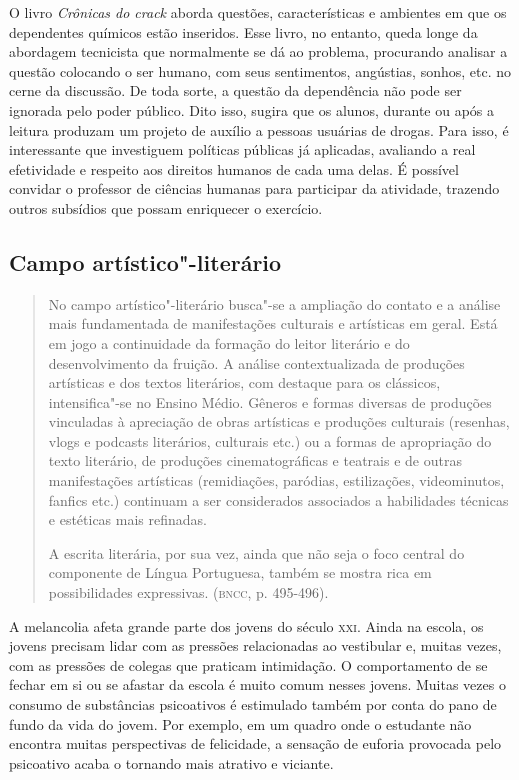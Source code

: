 \documentclass[11pt]{extarticle}
\begin{document}
O livro \emph{Crônicas do crack} aborda questões, características e
ambientes em que os dependentes químicos estão inseridos. Esse livro,
no entanto, queda longe da abordagem tecnicista que normalmente se dá
ao problema, procurando analisar a questão colocando o ser humano, com
seus sentimentos, angústias, sonhos, etc. no cerne da discussão. De
toda sorte, a questão da dependência não pode ser ignorada pelo poder
público. Dito isso, sugira que os alunos, durante ou após a leitura
produzam um projeto de auxílio a pessoas usuárias de drogas. Para
isso, é interessante que investiguem políticas públicas já aplicadas,
avaliando a real efetividade e respeito aos direitos humanos de cada
uma delas. É possível convidar o professor de ciências humanas para
participar da atividade, trazendo outros subsídios que possam
enriquecer o exercício.


\subsection{Campo artístico"-literário}

\begin{quote}
No campo artístico"-literário busca"-se a ampliação do contato e a
análise mais fundamentada de manifestações culturais e artísticas em
geral. Está em jogo a continuidade da formação do leitor literário e do
desenvolvimento da fruição. A análise contextualizada de produções
artísticas e dos textos literários, com destaque para os clássicos,
intensifica"-se no Ensino Médio. Gêneros e formas diversas de produções
vinculadas à apreciação de obras artísticas e produções culturais
(resenhas, vlogs e podcasts literários, culturais etc.) ou a formas de
apropriação do texto literário, de produções cinematográficas e teatrais
e de outras manifestações artísticas (remidiações, paródias,
estilizações, videominutos, fanfics etc.) continuam a ser considerados
associados a habilidades técnicas e estéticas mais refinadas.

A escrita literária, por sua vez, ainda que não seja o foco central do
componente de Língua Portuguesa, também se mostra rica em possibilidades
expressivas. (\textsc{bncc}, p. 495-496).
\end{quote}

A melancolia afeta grande parte dos jovens do século \textsc{xxi}. Ainda na
escola, os jovens precisam lidar com as pressões relacionadas ao
vestibular e, muitas vezes, com as pressões de colegas que praticam
intimidação. O comportamento de se fechar em si ou se afastar da
escola é muito comum nesses jovens. Muitas vezes o consumo de
substâncias psicoativos é estimulado também por conta do pano de fundo
da vida do jovem. Por exemplo, em um quadro onde o estudante não
encontra muitas perspectivas de felicidade, a sensação de euforia
provocada pelo psicoativo acaba o tornando mais atrativo e viciante.
\end{document}
